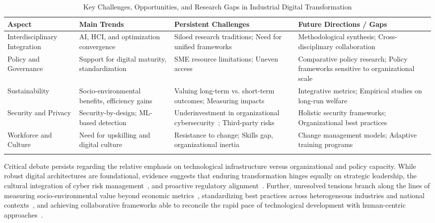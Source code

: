 \documentclass[sigconf]{acmart}
\begin{document}
\begin{table*}[htbp]
\centering
\caption{Key Challenges, Opportunities, and Research Gaps in Industrial Digital Transformation}
\label{tab:implications-summary}
\begin{adjustbox}{max width=\textwidth}
\begin{tabular}{@{}llll@{}}
\toprule
Aspect & Main Trends & Persistent Challenges & Future Directions / Gaps \\
\midrule
Interdisciplinary Integration & AI, HCI, and optimization convergence~\cite{ref41}\cite{ref86} & Siloed research traditions; Need for unified frameworks & Methodological synthesis; Cross-disciplinary collaboration\\
Policy and Governance & Support for digital maturity, standardization~\cite{ref21}\cite{ref23} & SME resource limitations; Uneven access & Comparative policy research; Policy frameworks sensitive to organizational scale\\
Sustainability & Socio-environmental benefits, efficiency gains~\cite{ref90} & Valuing long-term vs. short-term outcomes; Measuring impacts~\cite{ref25}\cite{ref88} & Integrative metrics; Empirical studies on long-run welfare\\
Security and Privacy & Security-by-design; ML-based detection~\cite{ref10}\cite{ref92} & Underinvestment in organizational cybersecurity~\cite{ref35}; Third-party risks & Holistic security frameworks; Organizational best practices\\
Workforce and Culture & Need for upskilling and digital culture~\cite{ref31} & Resistance to change; Skills gap, organizational inertia & Change management models; Adaptive training programs\\
\\
\bottomrule
\end{tabular}
\end{adjustbox}
\end{table*}

Critical debate persists regarding the relative emphasis on technological infrastructure versus organizational and policy capacity. While robust digital architectures are foundational, evidence suggests that enduring transformation hinges equally on strategic leadership, the cultural integration of cyber risk management~\cite{ref35}, and proactive regulatory alignment~\cite{ref91}. Further, unresolved tensions branch along the lines of measuring socio-environmental value beyond economic metrics~\cite{ref25}, standardizing best practices across heterogeneous industries and national contexts~\cite{ref23}, and achieving collaborative frameworks able to reconcile the rapid pace of technological development with human-centric approaches~\cite{ref90}.
\end{document}
